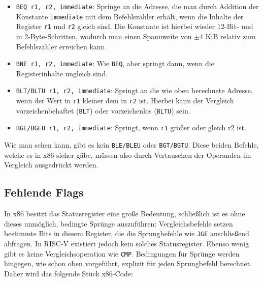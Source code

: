 \begin{itemize}
  \item \lstinline[style=risc-v_Assembler]!BEQ r1, r2, immediate!: Springe an die Adresse, die man durch
    Addition der Konstante \lstinline[style=risc-v_Assembler]!immediate! mit dem Befehlszähler erhält, wenn
    die Inhalte der Register \lstinline[style=risc-v_Assembler]!r1! und \lstinline[style=risc-v_Assembler]!r2! gleich sind. Die Konstante
    ist hierbei wieder 12-Bit- und in 2-Byte-Schritten, wodurch man einen
    Spannweite von $\pm 4$ KiB relativ zum Befehlszähler erreichen kann.
  \item \lstinline[style=risc-v_Assembler]!BNE r1, r2, immediate!: Wie \lstinline[style=risc-v_Assembler]!BEQ!, aber springt dann, wenn
    die Registerinhalte ungleich sind.
  \item \lstinline[style=risc-v_Assembler]!BLT/BLTU r1, r2, immediate!: Springt an die wie oben berechnete
    Adresse, wenn der Wert in \lstinline[style=risc-v_Assembler]!r1! kleiner dem in \lstinline[style=risc-v_Assembler]!r2! ist. Hierbei
    kann der Vergleich vorzeichenbehaftet (\lstinline[style=risc-v_Assembler]!BLT!) oder vorzeichenlos
    (\lstinline[style=risc-v_Assembler]!BLTU!) sein.
  \item \lstinline[style=risc-v_Assembler]!BGE/BGEU r1, r2, immediate!: Springt, wenn \lstinline[style=risc-v_Assembler]!r1! größer oder
    gleich r2 ist.
\end{itemize}

Wie man sehen kann, gibt es kein \lstinline[style=risc-v_Assembler]!BLE/BLEU! oder \lstinline[style=risc-v_Assembler]!BGT/BGTU!. Diese beiden
Befehle, welche es in x86 sicher gäbe, müssen also durch Vertauschen
der Operanden im Vergleich ausgedrückt werden.

\subsection{Fehlende Flags}

In x86 besitzt das Statusregister eine große Bedeutung, schließlich ist es ohne dieses unmöglich, bedingte Sprünge auszuführen: Vergleichsbefehle setzen bestimmte Bits in diesem Register, die die Sprungbefehle wie \lstinline[style=x86Assembler]!JGE! anschließend abfragen.
In RISC-V existiert jedoch kein solches Statusregister. Ebenso wenig gibt es keine
Vergleichsoperation wie \lstinline[style=x86Assembler]!CMP!. Bedingungen für Sprünge werden hingegen, wie schon oben vorgeführt, explizit für jeden Sprungbefehl berechnet. Daher wird das folgende Stück x86-Code:

